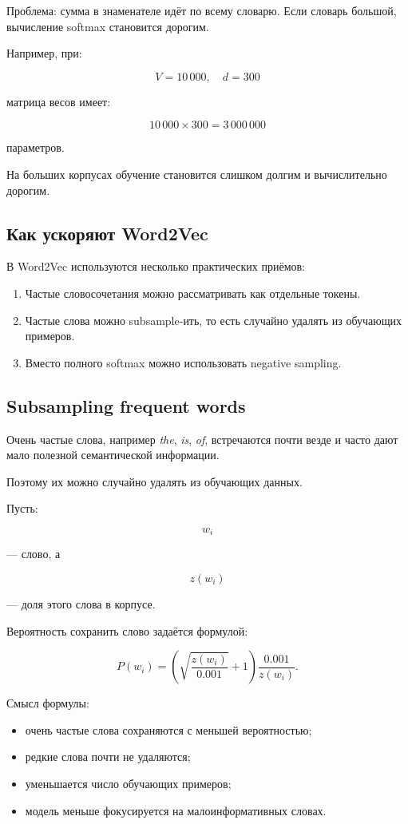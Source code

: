 \documentclass[a4paper,12pt]{article}
\begin{document}
Проблема: сумма в знаменателе идёт по всему словарю. Если словарь большой, вычисление softmax становится дорогим.

Например, при:

\[
V = 10\,000,
\quad
d = 300
\]

матрица весов имеет:

\[
10\,000 \times 300 = 3\,000\,000
\]

параметров.

На больших корпусах обучение становится слишком долгим и вычислительно дорогим.

\subsection{Как ускоряют Word2Vec}

В Word2Vec используются несколько практических приёмов:

\begin{enumerate}
    \item Частые словосочетания можно рассматривать как отдельные токены.
    \item Частые слова можно subsample-ить, то есть случайно удалять из обучающих примеров.
    \item Вместо полного softmax можно использовать negative sampling.
\end{enumerate}

\subsection{Subsampling frequent words}

Очень частые слова, например \textit{the}, \textit{is}, \textit{of}, встречаются почти везде и часто дают мало полезной семантической информации.

Поэтому их можно случайно удалять из обучающих данных.

Пусть:

\[
w_i
\]

--- слово, а

\[
z(w_i)
\]

--- доля этого слова в корпусе.

Вероятность сохранить слово задаётся формулой:

\[
P(w_i)
=
\left(
\sqrt{\frac{z(w_i)}{0.001}} + 1
\right)
\frac{0.001}{z(w_i)}.
\]

Смысл формулы:

\begin{itemize}
    \item очень частые слова сохраняются с меньшей вероятностью;
    \item редкие слова почти не удаляются;
    \item уменьшается число обучающих примеров;
    \item модель меньше фокусируется на малоинформативных словах.
\end{itemize}
\end{document}
